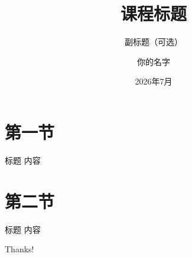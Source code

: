 ﻿\documentclass[aspectratio=169]{ctexbeamer}
\author{你的名字}
\title{课程标题}
\subtitle{副标题（可选）}
\date{2026年7月}
\begin{document}
\kaishu

\begin{frame}
    \titlepage
\end{frame}



\section{第一节}

\begin{frame}{标题}
    内容
\end{frame}

\section{第二节}

\begin{frame}{标题}
    内容
\end{frame}


\begin{frame}
    \begin{center}
        {\Huge\calligra Thanks!}
    \end{center}
\end{frame}
\end{document}
